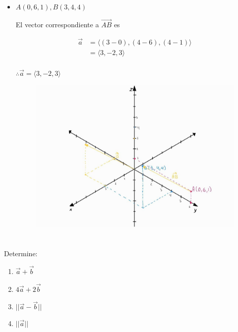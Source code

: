 \documentclass[12pt]{article}
\begin{document}
\begin{itemize}
\item $A(0,6,1), B(3,4,4)$

  El vector correspondiente a $\vec{AB}$ es

  \begin{align*}
    \vec{a}
    &=
    \langle
    (3-0),
    (4-6),
    (4-1)
    \rangle \\
    &=
    \langle
    3,
    -2,
    3
    \rangle \\
  \end{align*}

  $\therefore \vec{a} = \langle 3, -2, 3 \rangle$
  \begin{figure}[H]
    \centering
    \includegraphics[width=1\textwidth]{./img/vecr3.jpeg}
  \end{figure}

\end{itemize}



\section{}

Determine:

\begin{enumerate}[format=\textbf]
  
\item $\vec{a} + \vec{b}$
  
\item $4 \vec{a} + 2\vec{b}$

\item $||\vec{a} - \vec{b}||$

\item $||\vec{a}||$

\end{enumerate}
\end{document}
